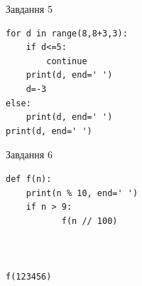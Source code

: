 \documentclass[12pt, ukrainian]{article}
\begin{document}
{\vspace{15mm}
\begin{minipage}[t]{9.7cm}                
{\begin{center}Завдання {5}\end{center}}
\begin{verbatim}
for d in range(8,8+3,3):
    if d<=5:
        continue
    print(d, end=' ')
    d=-3
else:
    print(d, end=' ')
print(d, end=' ')
\end{verbatim}     
\end{minipage}
\vline \hspace{8mm}
\begin{minipage}[t]{8.0cm}                
{\begin{center}Завдання {6}\end{center}}
\begin{verbatim}
def f(n):
    print(n % 10, end=' ')
    if n > 9:
           f(n // 100)
    


f(123456)
\end{verbatim}     
\end{minipage}

}
\newpage
\end{document}
